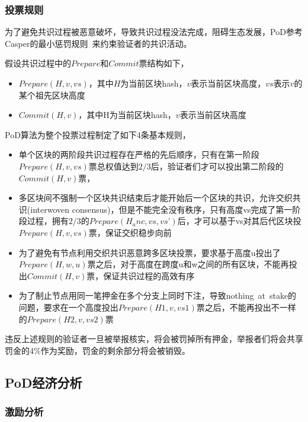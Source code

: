 \subsubsection{投票规则}
\label{pod:design:vote}

为了避免共识过程被恶意破坏，导致共识过程没法完成，阻碍生态发展，PoD参考Casper的最小惩罚规则~\cite{minimal_slash_rules}来约束验证者的共识活动。

假设共识过程中的$Prepare$和$Commit$票结构如下，
\begin{itemize}
\item $Prepare(H, v, vs)$，其中$H$为当前区块hash，$v$表示当前区块高度，$vs$表示$v$的某个祖先区块高度
\item $Commit(H, v)$，其中H为当前区块hash，$v$表示当前区块高度
\end{itemize}

PoD算法为整个投票过程制定了如下4条基本规则，

\begin{itemize}
\item 单个区块的两阶段共识过程存在严格的先后顺序，只有在第一阶段$Prepare(H, v, vs)$票总权值达到$2/3$后，验证者们才可以投出第二阶段的$Commit(H, v)$票，
\item 多区块间不强制一个区块共识结束后才能开始后一个区块的共识，允许交织共识(interwoven consensus)，但是不能完全没有秩序，只有高度vs完成了第一阶段过程，拥有$2/3$的$Prepare(H_anc, vs, vs’)$后，才可以基于vs对其后代区块投$Prepare(H, v, vs)$票，保证交织稳步向前
\item 为了避免有节点利用交织共识恶意跨多区块投票，要求基于高度u投出了$Prepare(H, w, u)$票之后，对于高度在跨度u和w之间的所有区块，不能再投出$Commit(H, v)$票，保证共识过程的高效有序
\item 为了制止节点用同一笔押金在多个分支上同时下注，导致nothing~at~stake的问题，要求在一个高度投出$Prepare(H1, v, vs1)$票之后，不能再投出不一样的$Prepare(H2, v, vs2)$票
\end{itemize}

违反上述规则的验证者一旦被举报核实，将会被罚掉所有押金，举报者们将会共享罚金的4\%作为奖励，罚金的剩余部分将会被销毁。

\subsection{PoD经济分析}
\label{pod:economic}

\subsubsection{激励分析}
\label{pod:economic:incentive}

